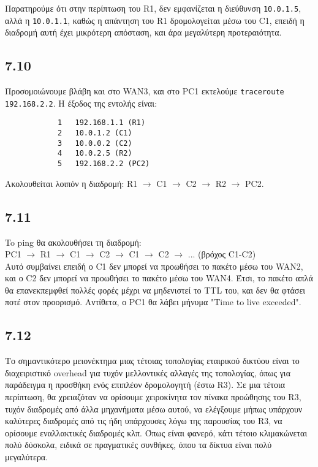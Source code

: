 \documentclass[a4paper, 12pt]{article}
\begin{document}
		Παρατηρούμε ότι στην περίπτωση του R1, δεν εμφανίζεται η διεύθυνση \verb|10.0.1.5|, αλλά η \verb|10.0.1.1|, καθώς η απάντηση του R1 δρομολογείται μέσω του C1, επειδή η διαδρομή αυτή έχει μικρότερη απόσταση, και άρα μεγαλύτερη προτεραιότητα. 

	\subsection*{7.10}
		Προσομοιώνουμε βλάβη και στο WAN3, και στο PC1 εκτελούμε \verb|traceroute 192.168.2.2|. Η έξοδος της εντολής είναι:
		
		\begin{verbatim}
			1   192.168.1.1 (R1)
			2   10.0.1.2 (C1)
			3   10.0.0.2 (C2)
			4   10.0.2.5 (R2)
			5   192.168.2.2 (PC2)
		\end{verbatim}

		Ακολουθείται λοιπόν η διαδρομή: R1 $\rightarrow$ C1 $\rightarrow$ C2 $\rightarrow$ R2 $\rightarrow$ PC2.
		
	\subsection*{7.11}
		To ping θα ακολουθήσει τη διαδρομή: \\
		
		PC1 $\rightarrow$ R1 $\rightarrow$ C1 $\rightarrow$ C2 $\rightarrow$ C1 $\rightarrow$ C2 $\rightarrow$ ... (βρόχος C1-C2) \\
		
		Αυτό συμβαίνει επειδή ο C1 δεν μπορεί να προωθήσει το πακέτο μέσω του WAN2, και ο C2 δεν μπορεί να προωθήσει το πακέτο μέσω του WAN4. Έτσι, το πακέτο απλά θα επανεκπεμφθεί πολλές φορές μέχρι να μηδενιστεί το TTL του, και δεν θα φτάσει ποτέ στον προορισμό. Αντίθετα, ο PC1 θα λάβει μήνυμα "Time to live exceeded".
	
	\subsection*{7.12} 		
		Το σημαντικότερο μειονέκτημα μιας τέτοιας τοπολογίας εταιρικού δικτύου είναι το διαχειριστικό overhead για τυχόν μελλοντικές αλλαγές της τοπολογίας, όπως για παράδειγμα η προσθήκη ενός επιπλέον δρομολογητή (έστω R3). Σε μια τέτοια περίπτωση, θα χρειαζόταν να ορίσουμε χειροκίνητα τον πίνακα προώθησης του R3, τυχόν διαδρομές από άλλα μηχανήματα μέσω αυτού, να ελέγξουμε μήπως υπάρχουν καλύτερες διαδρομές από τις ήδη υπάρχουσες λόγω της παρουσίας του R3, να ορίσουμε εναλλακτικές διαδρομές κλπ. Όπως είναι φανερό, κάτι τέτοιο κλιμακώνεται πολύ δύσκολα, ειδικά σε πραγματικές συνθήκες, όπου τα δίκτυα είναι πολύ μεγαλύτερα.
\end{document}
